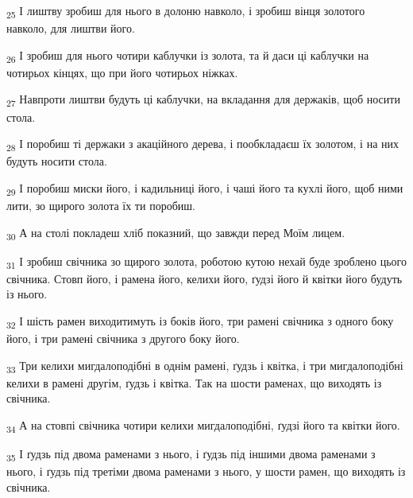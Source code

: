 \begin{tcolorbox}
\textsubscript{25} І лиштву зробиш для нього в долоню навколо, і зробиш вінця золотого навколо, для лиштви його.
\end{tcolorbox}
\begin{tcolorbox}
\textsubscript{26} І зробиш для нього чотири каблучки із золота, та й даси ці каблучки на чотирьох кінцях, що при його чотирьох ніжках.
\end{tcolorbox}
\begin{tcolorbox}
\textsubscript{27} Навпроти лиштви будуть ці каблучки, на вкладання для держаків, щоб носити стола.
\end{tcolorbox}
\begin{tcolorbox}
\textsubscript{28} І поробиш ті держаки з акаційного дерева, і пообкладаєш їх золотом, і на них будуть носити стола.
\end{tcolorbox}
\begin{tcolorbox}
\textsubscript{29} І поробиш миски його, і кадильниці його, і чаші його та кухлі його, щоб ними лити, зо щирого золота їх ти поробиш.
\end{tcolorbox}
\begin{tcolorbox}
\textsubscript{30} А на столі покладеш хліб показний, що завжди перед Моїм лицем.
\end{tcolorbox}
\begin{tcolorbox}
\textsubscript{31} І зробиш свічника зо щирого золота, роботою кутою нехай буде зроблено цього свічника. Стовп його, і рамена його, келихи його, ґудзі його й квітки його будуть із нього.
\end{tcolorbox}
\begin{tcolorbox}
\textsubscript{32} І шість рамен виходитимуть із боків його, три рамені свічника з одного боку його, і три рамені свічника з другого боку його.
\end{tcolorbox}
\begin{tcolorbox}
\textsubscript{33} Три келихи мигдалоподібні в однім рамені, ґудзь і квітка, і три мигдалоподібні келихи в рамені другім, ґудзь і квітка. Так на шости раменах, що виходять із свічника.
\end{tcolorbox}
\begin{tcolorbox}
\textsubscript{34} А на стовпі свічника чотири келихи мигдалоподібні, ґудзі його та квітки його.
\end{tcolorbox}
\begin{tcolorbox}
\textsubscript{35} І ґудзь під двома раменами з нього, і ґудзь під іншими двома раменами з нього, і ґудзь під третіми двома раменами з нього, у шости рамен, що виходять із свічника.
\end{tcolorbox}
